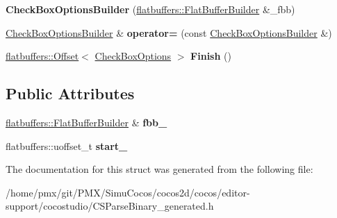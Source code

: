 \begin{DoxyCompactItemize}
\item 
\mbox{\label{structflatbuffers_1_1CheckBoxOptionsBuilder_a0ce799c2555ef76176856fda11fa1b3c}} 
{\bfseries Check\+Box\+Options\+Builder} (\hyperlink{classflatbuffers_1_1FlatBufferBuilder}{flatbuffers\+::\+Flat\+Buffer\+Builder} \&\+\_\+fbb)
\item 
\mbox{\label{structflatbuffers_1_1CheckBoxOptionsBuilder_a67f0df2f177eb217634224bfeb23561f}} 
\hyperlink{structflatbuffers_1_1CheckBoxOptionsBuilder}{Check\+Box\+Options\+Builder} \& {\bfseries operator=} (const \hyperlink{structflatbuffers_1_1CheckBoxOptionsBuilder}{Check\+Box\+Options\+Builder} \&)
\item 
\mbox{\label{structflatbuffers_1_1CheckBoxOptionsBuilder_adda35f88b6af82fac582eda1e653b5cf}} 
\hyperlink{structflatbuffers_1_1Offset}{flatbuffers\+::\+Offset}$<$ \hyperlink{structflatbuffers_1_1CheckBoxOptions}{Check\+Box\+Options} $>$ {\bfseries Finish} ()
\end{DoxyCompactItemize}
\subsection*{Public Attributes}
\begin{DoxyCompactItemize}
\item 
\mbox{\label{structflatbuffers_1_1CheckBoxOptionsBuilder_a4b99e4ab3b84c45a1cfdb89cda499cbf}} 
\hyperlink{classflatbuffers_1_1FlatBufferBuilder}{flatbuffers\+::\+Flat\+Buffer\+Builder} \& {\bfseries fbb\+\_\+}
\item 
\mbox{\label{structflatbuffers_1_1CheckBoxOptionsBuilder_aa5f121467760e59a856250aacd5b3774}} 
flatbuffers\+::uoffset\+\_\+t {\bfseries start\+\_\+}
\end{DoxyCompactItemize}


The documentation for this struct was generated from the following file\+:\begin{DoxyCompactItemize}
\item 
/home/pmx/git/\+P\+M\+X/\+Simu\+Cocos/cocos2d/cocos/editor-\/support/cocostudio/C\+S\+Parse\+Binary\+\_\+generated.\+h\end{DoxyCompactItemize}
